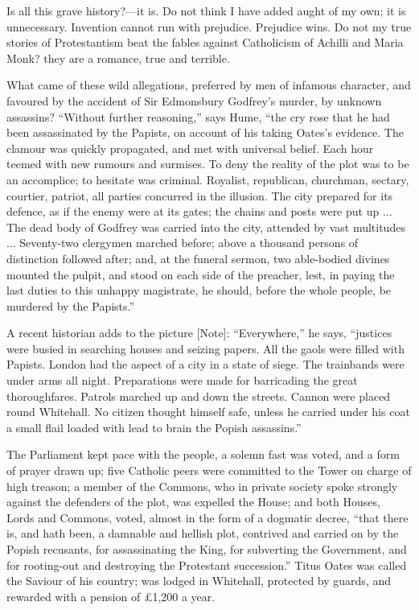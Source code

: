 Is all this grave history?—it is. Do not think I
have added aught of my own; it is unnecessary. Invention
cannot run with prejudice. Prejudice wins. Do not my true
stories of Protestantism beat the fables against
Catholicism of Achilli and Maria Monk? they are a
romance, true and terrible.

What came of these wild allegations, preferred by men
of infamous character, and favoured by the accident of
Sir Edmonsbury Godfrey's murder, by unknown assassins?
``Without further reasoning,'' says Hume,
``the cry rose that he had been assassinated by the
Papists, on account of his taking Oates's evidence. The
clamour was quickly propagated, and met with universal
belief. Each hour teemed with new rumours and surmises.
To deny the reality of the plot was to be an accomplice;
to hesitate was criminal. Royalist, republican,
churchman, sectary, courtier, patriot, all parties
concurred in the illusion. The city prepared for its
defence, as if the enemy were at its gates; the chains
and posts were put up ... The dead body of Godfrey was
carried into the city, attended by vast multitudes ...
Seventy-two clergymen marched before; above a thousand
persons of distinction followed after; and, at the
funeral sermon, two able-bodied divines mounted the
pulpit, and stood on each side of the preacher, lest, in
paying the last duties to this unhappy magistrate, he
should, before the whole people, be murdered by the
Papists.''

A recent historian adds to the picture [Note]:
``Everywhere,'' he says, ``justices were
busied in searching houses and seizing papers. All the
gaols were filled with Papists. London had the aspect of
a city in a state of siege. The trainbands were under
arms all night. Preparations were made for barricading
the great thoroughfares. Patrols marched up and down the
streets. Cannon were placed round Whitehall. No citizen
thought himself safe, unless he carried under his coat a
small flail loaded with lead to brain the Popish
assassins.''

The Parliament kept pace with the people, a solemn
fast was voted, and a form of prayer drawn up; five
Catholic peers were committed to the Tower on charge of
high treason; a member of the Commons, who in private
society spoke strongly against the defenders of the plot,
was expelled the House; and both Houses, Lords and
Commons, voted, almost in the form of a dogmatic decree,
``that there is, and hath been, a damnable and
hellish plot, contrived and carried on by the Popish
recusants, for assassinating the King, for subverting the
Government, and for rooting-out and destroying the
Protestant succession.'' Titus Oates was called the Saviour
of his country; was lodged in Whitehall, protected by
guards, and rewarded with a pension of £1,200 a year.

